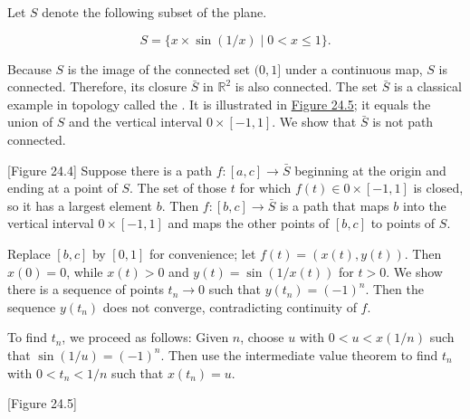 \begin{centeredblock*}
\begin{example}
\label{ex:\thesection.\theexample}
 Let \(S\) denote the following subset of the plane.

 \[
 S = \{ x \times \sin ( {1/x}) \mid 0 < x \leq 1\}.
 \]

Because \(S\) is the image of the connected set \((0,1\rbrack\) under a continuous map, \(S\) is connected. Therefore, its closure \(\bar{S}\) in \(\mathbb{R}^{2}\) is also connected. The set \(\bar{S}\) is a classical example in topology called the . It is illustrated in \hyperref[fig:24.5]{Figure 24.5}; it equals the union of \(S\) and the vertical interval \(0 \times [ {-1,1}]\). We show that \(\bar{S}\) is not path connected.

[Figure 24.4]
Suppose there is a path \(f : [ {a,c}] \rightarrow \bar{S}\) beginning at the origin and ending at a point of \(S\). The set of those \(t\) for which \(f( t) \in 0 \times [ {-1,1}]\) is closed, so it has a largest element \(b\). Then \(f : [ {b,c}] \rightarrow \bar{S}\) is a path that maps \(b\) into the vertical interval \(0 \times [ {-1,1}]\) and maps the other points of \([ {b,c}]\) to points of \(S\).

Replace \([ {b,c}]\) by \([ {0,1}]\) for convenience; let \(f( t) = ( {x( t),y( t) })\). Then \(x( 0) = 0\), while \(x( t) > 0\) and \(y( t) = \sin ( {1/x( t) })\) for \(t > 0\). We show there is a sequence of points \(t_{n} \rightarrow 0\) such that \(y( t_{n}) = {( -1) }^{n}\). Then the sequence \(y( t_{n})\) does not converge, contradicting continuity of \(f\).

To find \(t_{n}\), we proceed as follows: Given \(n\), choose \(u\) with \(0 < u < x( {1/n})\) such that \(\sin ( {1/u}) = {( -1) }^{n}\). Then use the intermediate value theorem to find \(t_{n}\) with \(0 < t_{n} < 1/n\) such that \(x( t_{n}) = u\).

[Figure 24.5]
\end{example}
\end{centeredblock*}

